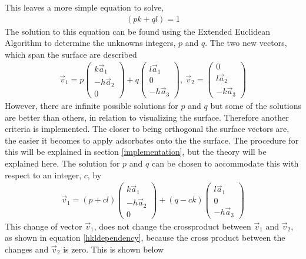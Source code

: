 \documentclass[11pt]{article} %
\begin{document}
This leaves a more simple equation to solve, 
\begin{eqnarray}
(pk + ql) = 1 \label{EquationFromTheory}
\end{eqnarray}
The solution to this equation can be found using the Extended Euclidean Algorithm to determine the unknowns integers, $p$ and $q$. The two new vectors, which span the surface are described
\begin{eqnarray}
\vec{v}_1 = p \left( \begin{array}{c} k\vec{a}_1 \\ - h \vec{a}_2 \\ 0 \end{array} \right) + q \left( \begin{array}{c} l \vec{a}_1 \\ 0 \\ - h \vec{a}_3 \end{array} \right), \ \vec{v}_2 = \left( \begin{array}{c} 0 \\ l\vec{a}_2 \\ -k\vec{a}_3 \end{array} \right) \label{v2formalism}
\end{eqnarray}
However, there are infinite possible solutions for $p$ and $q$ but some of the solutions are better than others, in relation to visualizing the surface. Therefore another criteria is implemented. The closer to being orthogonal the surface vectors are, the easier it becomes to apply adsorbates onto the the surface. The procedure for this will be explained in section \ref{implementation}, but the theory will be explained here. The solution for $p$ and $q$ can be chosen to accommodate this with respect to an integer, $c$, by
\begin{eqnarray}
\vec{v}_1 = (p+cl)\left( \begin{array}{c} k\vec{a}_1 \\ - h \vec{a}_2 \\ 0 \end{array} \right) + (q-ck)\left( \begin{array}{c} l \vec{a}_1 \\ 0 \\ - h \vec{a}_3 \end{array} \right) \label{v1formalism}
\end{eqnarray}
This change of vector $\vec{v}_1$, does not change the crossproduct between $\vec{v}_1$ and $\vec{v}_2$, as shown in equation \ref{hkldependency}, because the cross product between the changes and $\vec{v}_2$ is zero. This is shown below
\end{document}
